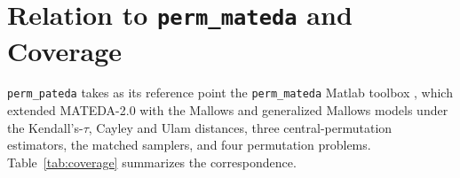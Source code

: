 \documentclass[a4paper,11pt]{article}
\begin{document}
\section{Relation to \texttt{perm\_mateda} and Coverage}
\label{sec:coverage}

\texttt{perm\_pateda} takes as its reference point the \texttt{perm\_mateda}
Matlab toolbox \citep{Irurozki_et_al:2018}, which extended MATEDA-2.0
\citep{Santana_et_al:2009b} with the Mallows and generalized Mallows models under
the Kendall's-$\tau$, Cayley and Ulam distances, three central-permutation
estimators, the matched samplers, and four permutation problems.
Table~\ref{tab:coverage} summarizes the correspondence.
\end{document}
